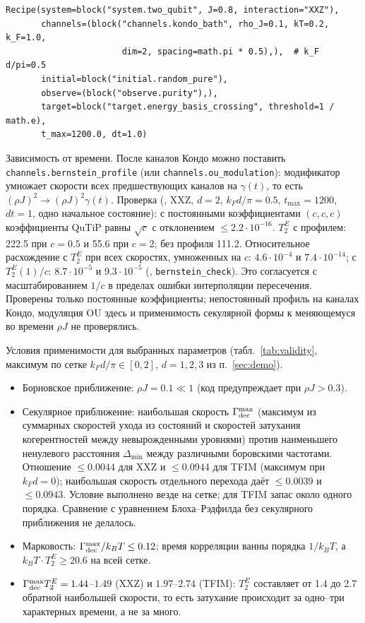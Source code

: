 \documentclass[12pt,a4paper]{article}
\newcommand{\rhoJ}{\rho J}
\newcommand{\kT}{k_BT}
\begin{document}
\begin{verbatim}
Recipe(system=block("system.two_qubit", J=0.8, interaction="XXZ"),
       channels=(block("channels.kondo_bath", rho_J=0.1, kT=0.2, k_F=1.0,
                       dim=2, spacing=math.pi * 0.5),),  # k_F d/pi=0.5
       initial=block("initial.random_pure"),
       observe=(block("observe.purity"),),
       target=block("target.energy_basis_crossing", threshold=1 / math.e),
       t_max=1200.0, dt=1.0)
\end{verbatim}

Зависимость от времени. После каналов Кондо можно поставить \texttt{channels.bernstein\_profile}
(или \texttt{channels.ou\_modulation}): модификатор умножает скорости всех предшествующих каналов на
$\gamma(t)$, то есть $(\rhoJ)^2\to(\rhoJ)^2\gamma(t)$. Проверка (,
XXZ, $d=2$, $k_Fd/\pi=0.5$, $t_{\max}=1200$, $dt=1$, одно начальное состояние): с постоянными
коэффициентами $(c,c,c)$ коэффициенты QuTiP равны $\sqrt c$ с отклонением
$\le2.2\cdot10^{-16}$. $T_2^E$ с профилем: 222.5 при $c=0.5$ и 55.6 при $c=2$; без профиля 111.2.
Относительное расхождение с $T_2^E$ при всех скоростях, умноженных на $c$: $4.6\cdot10^{-4}$ и
$7.4\cdot10^{-14}$; с $T_2^E(1)/c$: $8.7\cdot10^{-5}$ и $9.3\cdot10^{-5}$ (,
\texttt{bernstein\_check}). Это согласуется с масштабированием $1/c$ в пределах ошибки интерполяции
пересечения. Проверены только постоянные коэффициенты; непостоянный профиль на каналах Кондо, модуляция OU
здесь и применимость секулярной формы к меняющемуся во времени $\rhoJ$ не проверялись.

Условия применимости для выбранных параметров (табл.~\ref{tab:validity}, максимум по сетке
$k_Fd/\pi\in[0,2]$, $d=1,2,3$ из п.~\ref{sec:demo}).
\begin{itemize}
\item Борновское приближение: $\rhoJ=0.1\ll1$ (код предупреждает при $\rhoJ>0.3$).
\item Секулярное приближение: наибольшая скорость $\Gamma_{\rm dec}^{\max}$ (максимум из
суммарных скоростей ухода из состояний и скоростей затухания когерентностей между невырожденными
уровнями) против наименьшего ненулевого расстояния $\Delta_{\min}$ между различными боровскими частотами.
Отношение $\le0.0044$ для XXZ и $\le0.0944$ для TFIM (максимум при $k_Fd=0$); наибольшая скорость отдельного
перехода даёт $\le0.0039$ и $\le0.0943$. Условие выполнено везде на сетке; для TFIM запас около одного порядка.
Сравнение с уравнением Блоха--Рэдфилда без секулярного приближения не делалось.
\item Марковость: $\Gamma_{\rm dec}^{\max}/\kT\le0.12$; время корреляции ванны порядка $1/\kT$, а
$\kT\cdot T_2^E\ge20.6$ на всей сетке.
\item $\Gamma_{\rm dec}^{\max}T_2^E=1.44$--$1.49$ (XXZ) и $1.97$--$2.74$ (TFIM): $T_2^E$ составляет
от 1.4 до 2.7 обратной наибольшей скорости, то есть затухание происходит за одно--три характерных времени, а не
за много.
\end{itemize}
\end{document}
